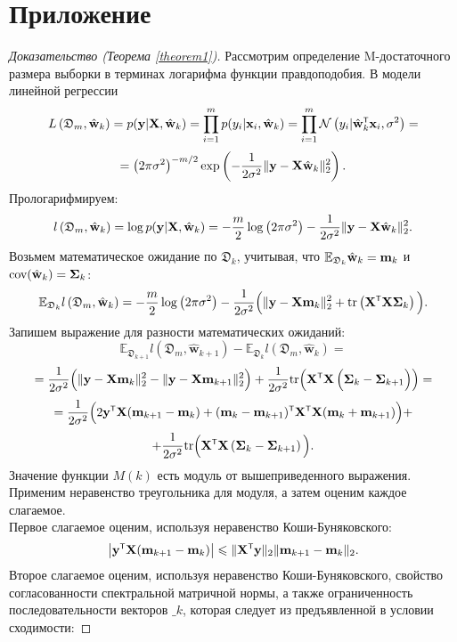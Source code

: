 \section{Приложение}\label{append}

\begin{proof}[Доказательство (Теорема \ref{theorem1})]
    Рассмотрим определение M-достаточного размера выборки в терминах логарифма функции правдоподобия. В модели линейной регрессии
    \[ L\left( \mathfrak{D}_m, \hat{\bw}_k \right) = p(\by | \bX, \hat{\bw}_k) = \prod_{i=1}^{m} p(y_i | \bx_i, \hat{\bw}_k) = \prod_{i=1}^{m} \mathcal{N}\left( y_i | \hat{\bw}_k\T \bx_i, \sigma^2 \right) = \]
    \[ = \left( 2\pi\sigma^2 \right)^{-m/2} \exp\left( -\dfrac{1}{2\sigma^2} \| \mathbf{y} - \mathbf{X} \hat{\mathbf{w}}_k \|_2^2 \right). \]
    Прологарифмируем:
    \[ l\left( \mathfrak{D}_m, \hat{\mathbf{w}}_k \right) = \log p(\mathbf{y} | \mathbf{X}, \hat{\mathbf{w}}_k) = -\dfrac{m}{2}\log\left( 2\pi\sigma^2 \right) - \dfrac{1}{2\sigma^2} \| \mathbf{y} - \mathbf{X} \hat{\mathbf{w}}_k \|_2^2. \]
    Возьмем математическое ожидание по $\mathfrak{D}_k$, учитывая, что $\mathbb{E}_{\mathfrak{D}_k}\hat{\mathbf{w}}_k = \mathbf{m}_k$ и $\text{cov}(\hat{\mathbf{w}}_k) = \boldsymbol{\Sigma}_k$:
    \[ \mathbb{E}_{\mathfrak{D}_k} l\left( \mathfrak{D}_m, \hat{\bw}_k \right) = -\dfrac{m}{2}\log\left( 2\pi\sigma^2 \right) - \dfrac{1}{2\sigma^2} \Big( \| \by - \bX \bm_k \|_2^2 + \text{tr}\left( \bX\T\bX \bSigma_k \right) \Big). \]
    Запишем выражение для разности математических ожиданий:
    \[ \mathbb{E}_{\mathfrak{D}_{k+1}} l(\mathfrak{D}_m, \hat{\mathbf{w}}_{k+1}) - \mathbb{E}_{\mathfrak{D}_k} l(\mathfrak{D}_m, \hat{\mathbf{w}}_{k}) = \]
    \[ = \dfrac{1}{2\sigma^2} \Big( \| \by - \bX \bm_k \|_2^2 - \| \by - \bX \bm_{k+1} \|_2^2 \Big) + \dfrac{1}{2\sigma^2} \text{tr} \Big( \bX\T\bX \left( \bSigma_k - \bSigma_{k+1} \Big) \right) = \]
    \[ = \dfrac{1}{2\sigma^2} \Big( 2 \by\T \bX (\bm_{k+1} - \bm_k) + (\bm_k - \bm_{k+1})\T \bX\T\bX (\bm_k + \bm_{k+1}) \Big) + \]
    \[ + \dfrac{1}{2\sigma^2} \text{tr} \Big( \bX\T\bX \left( \bSigma_k - \bSigma_{k+1} \right) \Big). \]
    Значение функции $M(k)$ есть модуль от вышеприведенного выражения. Применим неравенство треугольника для модуля, а затем оценим каждое слагаемое.\\
    Первое слагаемое оценим, используя неравенство Коши-Буняковского:
    \[ \big| \by\T\bX(\bm_{k+1}-\bm_k) \big| \leqslant \| \bX\T\by \|_2 \|\bm_{k+1} - \bm_k\|_2. \]
    Второе слагаемое оценим, используя неравенство Коши-Буняковского, свойство согласованности спектральной матричной нормы, а также ограниченность последовательности векторов $\bm_k$, которая следует из предъявленной в условии сходимости:

\end{proof}
